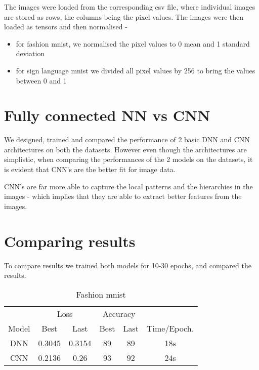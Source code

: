 \documentclass[12pt]{scrartcl}
\begin{document}
    The images were loaded from the corresponding csv file, where individual images are stored as rows, the columns being the pixel values. The images were then loaded as tensors and then normalised -
    \begin{itemize}
        \item for fashion mnist, we normalised the pixel values to 0 mean and 1 standard deviation
        \item for sign language mnist we divided all pixel values by 256 to bring the values between 0 and 1
    \end{itemize}

    \section{Fully connected NN vs CNN}

    We designed, trained and compared the performance of 2 basic DNN and CNN architectures on both the datasets. However even though the architectures are simplistic, when comparing the performances of the 2 models on the datasets, it is evident that CNN's are the better fit for image data.

    CNN's are far more able to capture the local patterns and the hierarchies in the images - which implies that they are able to extract better features from the images.

    \section{Comparing results}

    To compare results we trained both models for 10-30 epochs, and compared the results.

    \begin{table}[H]
        \centering
        \begin{tabular}{c|c|c|c|c|c}
            ~ & \multicolumn{2}{c|}{Loss} & \multicolumn{2}{c|}{Accuracy} &  \\ 
            Model & Best & Last & Best & Last & Time/Epoch. \\ \hline\hline
            DNN & 0.3045 & 0.3154 & 89 & 89 & 18s \\
            CNN & 0.2136 & 0.26 & 93 & 92 & 24s \\
        \end{tabular}
        \caption{Fashion mnist}
    \end{table}
\end{document}
